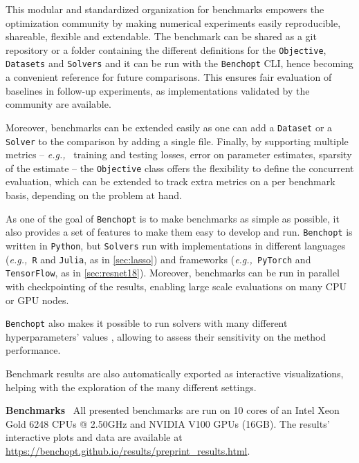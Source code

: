 \documentclass{article}
\newcommand{\eg}{{\em e.g.,~}}
\newcommand{\repo}[1]{#1}
\newcommand{\rebuttal}[1]{#1}
\newcommand{\Benchopt}{{{\texttt{Benchopt}}}}
\newcommand{\Python}{{{\texttt{Python}}}}
\newcommand{\PyTorch}{{{\texttt{PyTorch}}}}
\newcommand{\TensorFlow}{{{\texttt{TensorFlow}}}}
\newcommand{\myparagraph}[1]{\vspace{1mm}\noindent\textbf{#1} \,}
\begin{document}
This modular and standardized organization for benchmarks empowers the optimization community by making numerical experiments easily reproducible, shareable, flexible and extendable.
The benchmark can be shared as a git repository or a folder containing the different definitions for the \texttt{Objective}, \texttt{Datasets} and \texttt{Solvers} and it can be run with the \Benchopt{} CLI, hence becoming a convenient reference for future comparisons.
This ensures fair evaluation of baselines in follow-up experiments, as implementations validated by the community are available.
\rebuttal{
Moreover, benchmarks can be extended easily as one can add a \texttt{Dataset} or a \texttt{Solver} to the comparison by adding a single file.
Finally, by supporting multiple metrics -- \eg{} training and testing losses, error on parameter estimates, sparsity of the estimate -- the \texttt{Objective} class offers the flexibility to define the concurrent evaluation, which can be extended to track extra metrics on a per benchmark basis, depending on the problem at hand.
}

\rebuttal{
As one of the goal of \Benchopt{} is to make benchmarks as simple as possible, it also provides a set of features to make them easy to develop and run.}
\Benchopt{} is written in \Python{}, but \texttt{Solvers} run with implementations in different languages (\eg \texttt{R} and \texttt{Julia}, as in \autoref{sec:lasso}) and frameworks (\eg \PyTorch{} and \TensorFlow{}, as in \autoref{sec:resnet18}).
Moreover, benchmarks can be run in parallel with checkpointing of the results, enabling large scale evaluations on many CPU or GPU nodes.
\rebuttal{
\Benchopt{} also makes it possible to run solvers with many different hyperparameters' values , allowing to assess their sensitivity on the method performance.
}
Benchmark results are also automatically exported as interactive visualizations, helping with the exploration of the many different settings.


\myparagraph{Benchmarks} All presented benchmarks are run on 10 cores of an Intel Xeon Gold 6248 CPUs @ 2.50GHz and NVIDIA V100 GPUs (16GB). \repo{The results' interactive plots and data are available at \url{https://benchopt.github.io/results/preprint_results.html}.}
\end{document}
